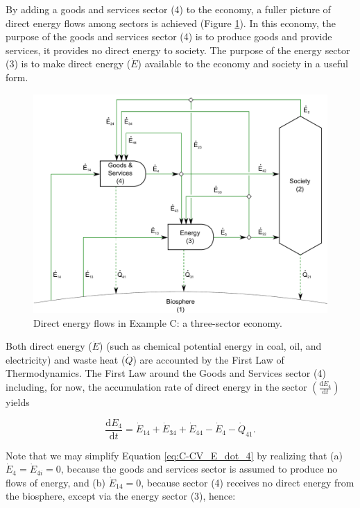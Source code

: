 By adding a goods and services sector (4) to the economy, 
a fuller picture of direct energy flows among sectors is achieved
(Figure \ref{fig:C_energy}). 
In this economy, the purpose of the goods and services sector (4) 
is to produce goods and provide services, 
it provides no direct energy to society. 
The purpose of the energy sector (3) is to make direct energy ($\dot{E}$) 
available to the economy and society in a useful form.

\begin{figure}[h!]
\centering
\includegraphics[width=0.8\linewidth]{Part_2/Chapter_Energy/images/3_sector_direct_energy.pdf}
\caption{Direct energy flows in Example C: a three-sector economy.}
\label{fig:C_energy}
\end{figure}

Both direct energy ($\dot{E}$) (such as chemical potential energy in coal, 
oil, and electricity) and waste heat ($\dot{Q}$) 
are accounted by the First Law of Thermodynamics. 
The First Law around the Goods and Services sector (4) including, 
for now, the accumulation rate of direct energy in the sector 
$\left(\frac{\mathrm{d}E_{4}}{\mathrm{d}t}\right)$ yields

\begin{equation} \label{eq:C-CV_E_dot_4}
	\frac{\mathrm{d}E_{4}}{\mathrm{d}t} 	 
	= \dot{E}_{14} 
	+ \dot{E}_{34} 
	+ \dot{E}_{44} 
	- \dot{E}_4 
	- \dot{Q}_{41}.
\end{equation}

Note that we may simplify Equation \ref{eq:C-CV_E_dot_4} 
by realizing that (a) $\dot{E}_{4} = \dot{E}_{4i} = 0$, 
because the goods and services sector 
is assumed to produce no flows of energy, 
and (b) $\dot{E}_{14} = 0$, 
because sector (4) receives no direct energy from the biosphere, 
except via the energy sector (3), hence:

